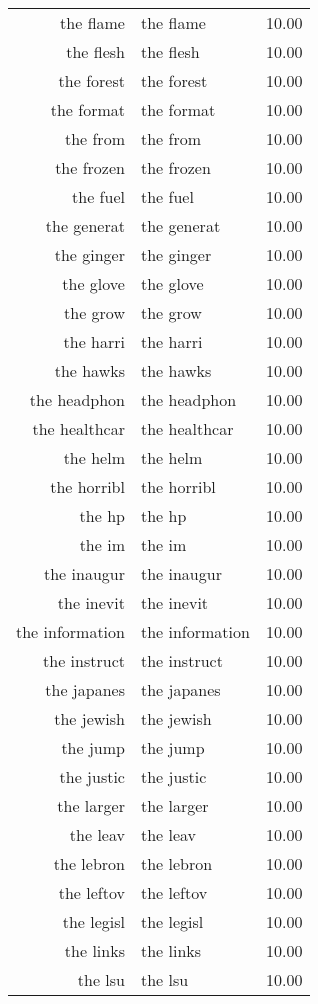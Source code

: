 \begin{table}[ht]
\begin{tabular}{rlr}
  the flame & the flame & 10.00 \\ 
  the flesh & the flesh & 10.00 \\ 
  the forest & the forest & 10.00 \\ 
  the format & the format & 10.00 \\ 
  the from & the from & 10.00 \\ 
  the frozen & the frozen & 10.00 \\ 
  the fuel & the fuel & 10.00 \\ 
  the generat & the generat & 10.00 \\ 
  the ginger & the ginger & 10.00 \\ 
  the glove & the glove & 10.00 \\ 
  the grow & the grow & 10.00 \\ 
  the harri & the harri & 10.00 \\ 
  the hawks & the hawks & 10.00 \\ 
  the headphon & the headphon & 10.00 \\ 
  the healthcar & the healthcar & 10.00 \\ 
  the helm & the helm & 10.00 \\ 
  the horribl & the horribl & 10.00 \\ 
  the hp & the hp & 10.00 \\ 
  the im & the im & 10.00 \\ 
  the inaugur & the inaugur & 10.00 \\ 
  the inevit & the inevit & 10.00 \\ 
  the information & the information & 10.00 \\ 
  the instruct & the instruct & 10.00 \\ 
  the japanes & the japanes & 10.00 \\ 
  the jewish & the jewish & 10.00 \\ 
  the jump & the jump & 10.00 \\ 
  the justic & the justic & 10.00 \\ 
  the larger & the larger & 10.00 \\ 
  the leav & the leav & 10.00 \\ 
  the lebron & the lebron & 10.00 \\ 
  the leftov & the leftov & 10.00 \\ 
  the legisl & the legisl & 10.00 \\ 
  the links & the links & 10.00 \\ 
  the lsu & the lsu & 10.00 \\ 

\end{tabular}
\end{table}
